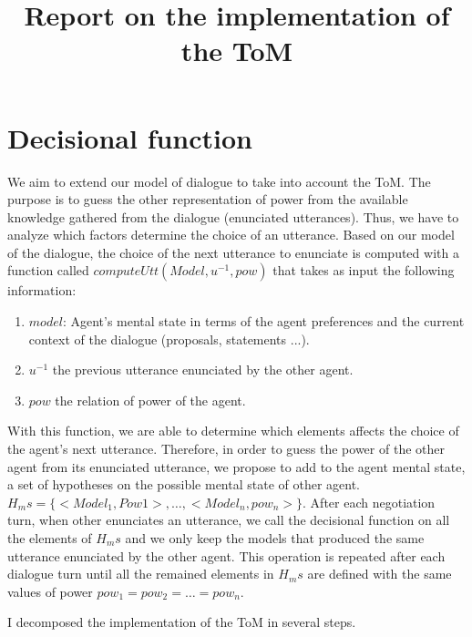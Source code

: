 \documentclass{llncs}
\begin{document}
\title{\vskip -10pt Report on the implementation of the ToM}

\maketitle 

\section{Decisional function}

We aim to extend our model of dialogue to take into account the ToM. The purpose is to guess the other representation of power from the available knowledge gathered from the dialogue (enunciated utterances).
Thus, we have to analyze which factors determine the choice of an utterance. Based on our model of the dialogue, the choice of the next utterance to enunciate is computed with a function called $computeUtt(Model, u^{-1}, pow) $ that takes as input the following information:
\begin{enumerate}
	\item $model$: Agent's mental state in terms of the agent preferences and the current context of the dialogue (proposals, statements ...).
	
	\item $u^{-1}$ the previous utterance enunciated by the other agent.
	
	\item $pow$ the relation of power of the agent. 
	
\end{enumerate}
With this function, we are able to determine which elements affects the choice of the agent's next utterance. Therefore,
in order to guess the power of the other agent from its enunciated utterance, we propose to add to the agent mental state, a set of hypotheses on the  possible mental state of other agent. $H_ms= \{<Model_1, Pow1>, \ldots, <Model_n, pow_n> \}$. After each negotiation turn, when other enunciates an utterance, we call the decisional function on all the elements of $H_ms$ and we only keep the models that produced the same utterance enunciated by the other agent.
This operation is repeated after each dialogue turn until all the remained elements in $H_ms$ are defined with the same values of power $pow_1 = pow_2 = \ldots = pow_n$.

I decomposed the implementation of the ToM in several steps. 
\end{document}
